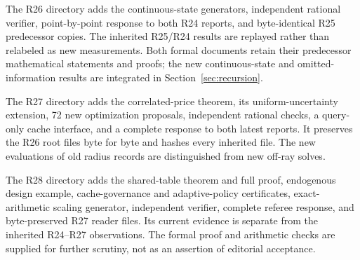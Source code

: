 \documentclass[11pt,letterpaper]{article}
\theoremstyle{definition}\newtheorem{assumption}[theorem]{Assumption}
\begin{document}
The R26 directory adds the continuous-state generators, independent rational verifier, point-by-point response to both R24 reports, and byte-identical R25 predecessor copies. The inherited R25/R24 results are replayed rather than relabeled as new measurements. Both formal documents retain their predecessor mathematical statements and proofs; the new continuous-state and omitted-information results are integrated in Section~\ref{sec:recursion}.

The R27 directory adds the correlated-price theorem, its uniform-uncertainty extension, 72 new optimization proposals, independent rational checks, a query-only cache interface, and a complete response to both latest reports. It preserves the R26 root files byte for byte and hashes every inherited file. The new evaluations of old radius records are distinguished from new off-ray solves.

The R28 directory adds the shared-table theorem and full proof, endogenous design example, cache-governance and adaptive-policy certificates, exact-arithmetic scaling generator, independent verifier, complete referee response, and byte-preserved R27 reader files. Its current evidence is separate from the inherited R24--R27 observations. The formal proof and arithmetic checks are supplied for further scrutiny, not as an assertion of editorial acceptance.


\end{document}
